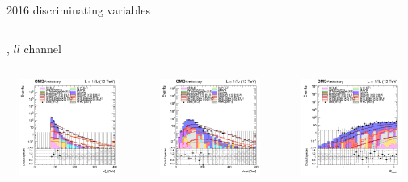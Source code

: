 \documentclass[8pt]{beamer}
\begin{document}
\begin{frame}{2016 discriminating variables}
\begin{columns}
\begin{column}{1.09\textwidth}
\begin{block}{, $ll$ channel}\end{block}\vspace{10pt}
\end{column}
\end{columns} \vspace{-5pt}
\begin{columns}
		\begin{column}{0.33\textwidth}
			\begin{center}
     			\includegraphics[width=1.0\textwidth, height=90pt]{figs/2016/log_cratio_topCR_ll_mt2ll.png}
    		\end{center}		
		\end{column} 
		\begin{column}{0.33\textwidth}
			\begin{center}
     			\includegraphics[width=1.0\textwidth, height=90pt]{figs/2016/log_cratio_topCR_ll_METcorrected_pt.png}
    		\end{center}		
		\end{column} 
		\begin{column}{0.33\textwidth}
			\begin{center}
     			\includegraphics[width=1.0\textwidth, height=90pt]{figs/2016/log_cratio_topCR_ll_dphillmet.png}

\end{center}
\end{column}
\end{columns}
\end{frame}
\end{document}

